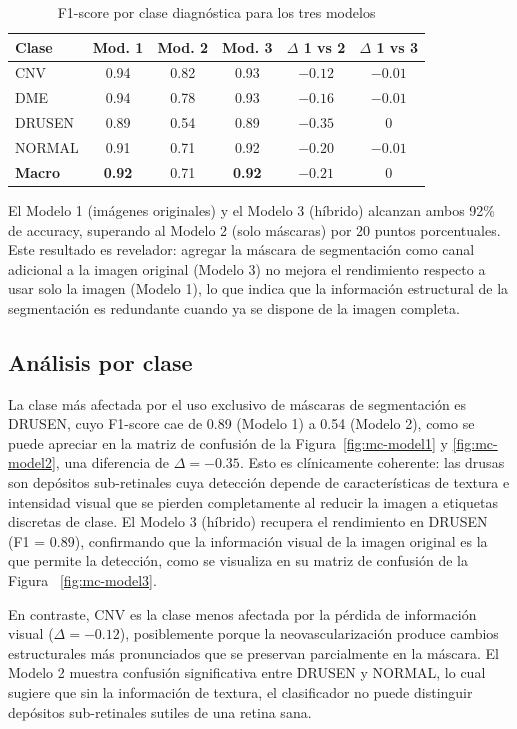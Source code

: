 \documentclass[journal, twocolumn]{IEEEtran}
\begin{document}
\begin{table}[h]
\caption{F1-score por clase diagnóstica para los tres modelos}
\label{tab:f1_per_class}
\centering
\begin{tabular}{lccccc}
\toprule
\textbf{Clase} & \textbf{Mod. 1} & \textbf{Mod. 2} & \textbf{Mod. 3} & \textbf{$\Delta$ 1 vs 2} & \textbf{$\Delta$ 1 vs 3} \\
\midrule
CNV    & 0.94 & 0.82 & 0.93 & $-0.12$ & $-0.01$ \\
DME    & 0.94 & 0.78 & 0.93 & $-0.16$ & $-0.01$ \\
DRUSEN & 0.89 & 0.54 & 0.89 & $-0.35$ & $0$ \\
NORMAL & 0.91 & 0.71 & 0.92 & $-0.20$ & $-0.01$ \\
\midrule
\textbf{Macro} & \textbf{0.92} & 0.71 & \textbf{0.92} & $-0.21$ & $0$ \\
\bottomrule
\end{tabular}
\end{table}

El Modelo 1 (imágenes originales) y el Modelo 3 (híbrido) alcanzan ambos 92\% de accuracy, superando al Modelo 2 (solo máscaras) por 20 puntos porcentuales. Este resultado es revelador: agregar la máscara de segmentación como canal adicional a la imagen original (Modelo 3) no mejora el rendimiento respecto a usar solo la imagen (Modelo 1), lo que indica que la información estructural de la segmentación es redundante cuando ya se dispone de la imagen completa.

\subsection{Análisis por clase}

La clase más afectada por el uso exclusivo de máscaras de segmentación es DRUSEN, cuyo F1-score cae de 0.89 (Modelo 1) a 0.54 (Modelo 2), como se puede apreciar en la matriz de confusión de la Figura~\ref{fig:mc-model1} y \ref{fig:mc-model2}, una diferencia de $\Delta = -0.35$. Esto es clínicamente coherente: las drusas son depósitos sub-retinales cuya detección depende de características de textura e intensidad visual que se pierden completamente al reducir la imagen a etiquetas discretas de clase. El Modelo 3 (híbrido) recupera el rendimiento en DRUSEN (F1 = 0.89), confirmando que la información visual de la imagen original es la que permite la detección, como se visualiza en su matriz de confusión de la Figura~ \ref{fig:mc-model3}.

En contraste, CNV es la clase menos afectada por la pérdida de información visual ($\Delta = -0.12$), posiblemente porque la neovascularización produce cambios estructurales más pronunciados que se preservan parcialmente en la máscara. El Modelo 2 muestra confusión significativa entre DRUSEN y NORMAL, lo cual sugiere que sin la información de textura, el clasificador no puede distinguir depósitos sub-retinales sutiles de una retina sana.
\end{document}
